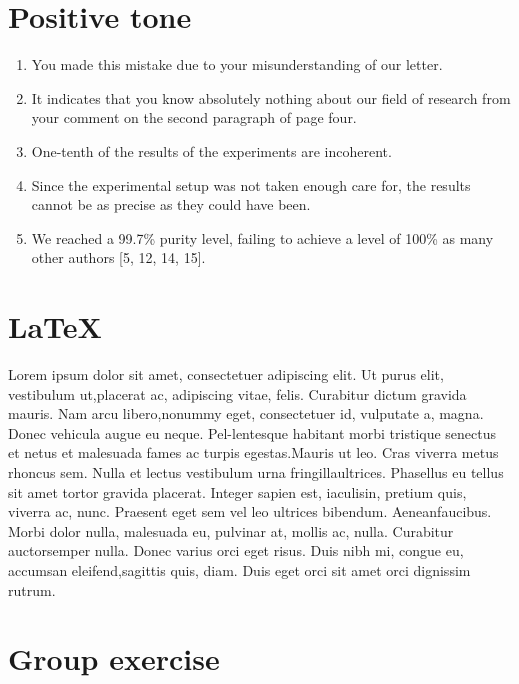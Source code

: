 \documentclass[paper=a4, fontsize=11pt]{scrartcl} %
\numberwithin{equation}{section} %
\numberwithin{figure}{section} %
\numberwithin{table}{section} %
\begin{document}
\section{Positive tone}
	\begin{enumerate}
		\item 
			You made this mistake due to your misunderstanding of our letter.
		\item 
			It indicates that you know absolutely nothing about our ﬁeld of research from your comment on the second paragraph of page four.
		\item
			 One-tenth of the results of the experiments are incoherent.
		\item
			 Since the experimental setup was not taken enough care for, the results cannot be as precise as they could have been.
		\item
			 We reached a 99.7\% purity level, failing to achieve a level of 100\% as many other authors [5, 12, 14, 15].
	\end{enumerate}

\section{\LaTeX}
	Lorem\citep{RN5}  ipsum  dolor\citep{RN11}  sit  amet,  consectetuer  adipiscing  elit.   Ut  purus  elit,  vestibulum  ut,placerat  ac,  adipiscing  vitae,  felis.   Curabitur  dictum  gravida  mauris.   Nam  arcu  libero,nonummy eget, consectetuer id, vulputate a, magna.  Donec vehicula augue eu neque.  Pel-lentesque habitant morbi tristique senectus et netus et malesuada fames ac turpis egestas.Mauris ut leo.  Cras viverra metus rhoncus sem.  Nulla et lectus vestibulum urna fringillaultrices.   Phasellus\citep{RN14}  eu  tellus  sit  amet  tortor  gravida  placerat.   Integer  sapien  est,  iaculisin,  pretium  quis,  viverra  ac,  nunc.   Praesent  eget  sem  vel  leo  ultrices  bibendum.   Aeneanfaucibus.  Morbi dolor nulla, malesuada eu, pulvinar at, mollis ac, nulla.  Curabitur\citep{RN10} auctorsemper  nulla.   Donec  varius  orci  eget  risus.   Duis  nibh  mi,  congue  eu,  accumsan  eleifend,sagittis quis, diam.  Duis eget orci sit amet orci dignissim rutrum.

\section{Group exercise}



\end{document}
